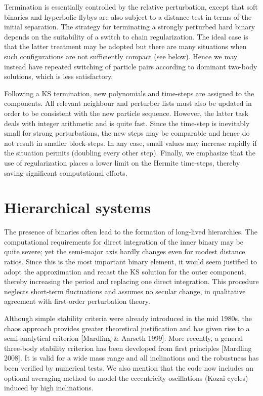 \documentclass[12pt]{article}
\begin{document}
Termination is essentially controlled by the relative perturbation, except
that soft binaries and hyperbolic flybys are also subject to a distance test
in terms of the initial separation.
The strategy for terminating a strongly perturbed hard binary depends on the
suitability of a switch to chain regularization.
The ideal case is that the latter treatment may be adopted but there are many
situations when such configurations are not sufficiently compact (see below).
Hence we may instead have repeated switching of particle pairs according to
dominant two-body solutions, which is less satisfactory.

Following a KS termination, new polynomials and time-steps are assigned to
the components.
All relevant neighbour and perturber lists must also be updated in order to
be consistent with the new particle sequence.
However, the latter task deals with integer arithmetic and is quite fast.
Since the \cm time-step is inevitably small for strong perturbations, the new
steps may be comparable and hence do not result in smaller block-steps.
In any case, small values may increase rapidly if the situation permits
(\ie doubling every other step).
Finally, we emphasize that the use of regularization places a lower limit on
the Hermite time-steps, thereby saving significant computational efforts.

\section{Hierarchical systems}

The presence of binaries often lead to the formation of long-lived
hierarchies.
The computational requirements for direct integration of the inner binary may
be quite severe; yet the semi-major axis hardly changes even for modest
distance ratios.
Since this is the most important binary element, it would seem justified to
adopt the \cm approximation and recast the KS solution for the outer
component, thereby increasing the period and replacing one direct
integration.
This procedure neglects short-term fluctuations and assumes no secular
change, in qualitative agreement with first-order perturbation theory.

Although simple stability criteria were already introduced in the mid 1980s,
the chaos approach provides greater theoretical justification and has given
rise to a semi-analytical criterion [Mardling \& Aarseth 1999].
More recently, a general three-body stability criterion has been developed
from first principles [Mardling 2008].
It is valid for a wide mass range and all inclinations and the robustness
has been verified by numerical tests.
We also mention that the code now includes an optional averaging method
to model the eccentricity oscillations (Kozai cycles) induced by high
inclinations.
\end{document}
